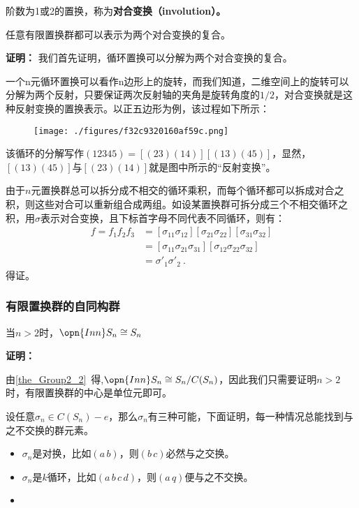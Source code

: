 
\begin{definition}{}
阶数为1或2的置换，称为\textbf{对合变换（involution）。}
\end{definition}
\begin{theorem}{}
任意有限置换群都可以表示为两个对合变换的复合。
\end{theorem}
\textbf{证明：}
我们首先证明，循环置换可以分解为两个对合变换的复合。

一个n元循环置换可以看作n边形上的旋转，而我们知道，二维空间上的旋转可以分解为两个反射，只要保证两次反射轴的夹角是旋转角度的$1/2$，对合变换就是这种反射变换的置换表示。以正五边形为例，该过程如下所示：
\begin{figure}[ht]
\centering
\texttt{[image: ./figures/f32c9320160af59c.png]}
\caption{} \label{fig_AutSym_2}
\end{figure}
该循环的分解写作$(12345)=[(23)(14)][(13)(45)]$，显然，$[(13)(45)]$与$[(23)(14)]$就是图中所示的“反射变换”。

由于$n$元置换群总可以拆分成不相交的循环乘积，而每个循环都可以拆成对合之积，则这些对合可以重新组合成两组。如设某置换群可拆分成三个不相交循环之积，用$\sigma$表示对合变换，且下标首字母不同代表不同循环，则有：
\begin{equation}
\begin{aligned}
f=f_1f_2f_3&=[\sigma_{11}\sigma_{12}][\sigma_{21}\sigma_{22}][\sigma_{31}\sigma_{32}]\\
&=[\sigma_{11}\sigma_{21}\sigma_{31}][\sigma_{12}\sigma_{22}\sigma_{32}]\\
&=\sigma'_1\sigma'_2~.
\end{aligned}
\end{equation}
得证。

\subsubsection{有限置换群的自同构群}

\begin{theorem}{}
当$n>2$时，$\opn{Inn}S_n\cong S_n$
\end{theorem}

\textbf{证明：}

由\autoref{the_Group2_2}~得,$\opn{Inn}S_n\cong S_n/C(S_n)$，因此我们只需要证明$n>2$时，有限置换群的中心是单位元即可。

设任意$\sigma_n\in C(S_n)-e$，那么$\sigma_n$有三种可能，下面证明，每一种情况总能找到与之不交换的群元素。

\begin{itemize}
\item $\sigma_n$是对换，比如$(a\,b)$，则$(b\,c)$必然与之交换。
\item $\sigma_n$是$k$循环，比如$(a\,b\,c\,d)$，则$(a\,q)$便与之不交换。
\item $$
\end{itemize}